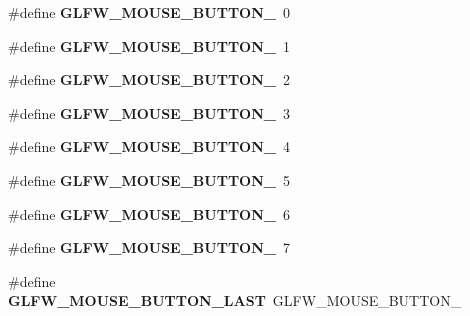 \begin{DoxyCompactItemize}
\item 
\mbox{\label{group__buttons_ga181a6e875251fd8671654eff00f9112e}} 
\#define {\bfseries G\+L\+F\+W\+\_\+\+M\+O\+U\+S\+E\+\_\+\+B\+U\+T\+T\+O\+N\+\_}~0
\item 
\mbox{\label{group__buttons_ga604b39b92c88ce9bd332e97fc3f4156c}} 
\#define {\bfseries G\+L\+F\+W\+\_\+\+M\+O\+U\+S\+E\+\_\+\+B\+U\+T\+T\+O\+N\+\_}~1
\item 
\mbox{\label{group__buttons_ga0130d505563d0236a6f85545f19e1721}} 
\#define {\bfseries G\+L\+F\+W\+\_\+\+M\+O\+U\+S\+E\+\_\+\+B\+U\+T\+T\+O\+N\+\_}~2
\item 
\mbox{\label{group__buttons_ga53f4097bb01d5521c7d9513418c91ca9}} 
\#define {\bfseries G\+L\+F\+W\+\_\+\+M\+O\+U\+S\+E\+\_\+\+B\+U\+T\+T\+O\+N\+\_}~3
\item 
\mbox{\label{group__buttons_gaf08c4ddecb051d3d9667db1d5e417c9c}} 
\#define {\bfseries G\+L\+F\+W\+\_\+\+M\+O\+U\+S\+E\+\_\+\+B\+U\+T\+T\+O\+N\+\_}~4
\item 
\mbox{\label{group__buttons_gae8513e06aab8aa393b595f22c6d8257a}} 
\#define {\bfseries G\+L\+F\+W\+\_\+\+M\+O\+U\+S\+E\+\_\+\+B\+U\+T\+T\+O\+N\+\_}~5
\item 
\mbox{\label{group__buttons_ga8b02a1ab55dde45b3a3883d54ffd7dc7}} 
\#define {\bfseries G\+L\+F\+W\+\_\+\+M\+O\+U\+S\+E\+\_\+\+B\+U\+T\+T\+O\+N\+\_}~6
\item 
\mbox{\label{group__buttons_ga35d5c4263e0dc0d0a4731ca6c562f32c}} 
\#define {\bfseries G\+L\+F\+W\+\_\+\+M\+O\+U\+S\+E\+\_\+\+B\+U\+T\+T\+O\+N\+\_}~7
\item 
\mbox{\label{group__buttons_gab1fd86a4518a9141ec7bcde2e15a2fdf}} 
\#define {\bfseries G\+L\+F\+W\+\_\+\+M\+O\+U\+S\+E\+\_\+\+B\+U\+T\+T\+O\+N\+\_\+\+L\+A\+ST}~G\+L\+F\+W\+\_\+\+M\+O\+U\+S\+E\+\_\+\+B\+U\+T\+T\+O\+N\+\_
\item 
\mbox{\label{group__buttons_gaf37100431dcd5082d48f95ee8bc8cd56}} 

\end{DoxyCompactItemize}
